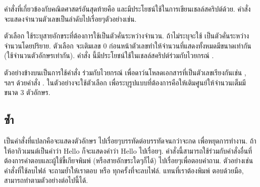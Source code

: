 \begin{thwbr}
\medskip
คำสั่งที่เกี่ยวข้องกับคณิตศาสตร์อันสุดท้ายคือ  และมีประโยชน์ใช้ในการเขียนเชลล์สคริปต์ด้วย. คำสั่ง  จะแสดงจำนวนตัวเลขเป็นลำดับไปเรื่อยๆตัวอย่างเช่น.
\begin{MyExample}
\end{MyExample}%
ตัวเลือก  ใช้ระบุสายอักขระที่ต้องการใช้เป็นตัวคั่นระหว่างจำนวน. ถ้าไม่ระบุจะใช้  เป็นตัวคั่นระหว่างจำนวนโดยปริยาย. ตัวเลือก  จะเติมเลข 0 ก่อนหน้าตัวเลขทำให้จำนวนที่แสดงทั้งหมดมีขนาดเท่ากัน (ใช้จำนวนตัวอักษรเท่ากัน). คำสั่ง  นี้มีประโยชน์ใช้ในเชลล์สคริปต์ร่วมกับไวยกรณ์ .
\begin{MyExample}
\end{MyExample}
ตัวอย่างข้างบนเป็นการใช้คำสั่ง  ร่วมกับไวยกรณ์  เพื่อดาว์นโหลดเอกสารที่เป็นตัวเลขเรียงกันเช่น ,  ฯลฯ ด้วยคำสั่ง . ในตัวอย่างจะใช้ตัวเลือก  เพื่อระบุรูปแบบที่ต้องการคือให้เติมศูนย์ให้จำนวนเต็มมีขนาด 3 ตัวอักษร.

\subsection{ซ้ำ}
 เป็นคำสั่งที่แปลกคือจะแสดงตัวอักษร  ไปเรื่อยๆบรรทัดต่อบรรทัดจนกว่าจะกด  เพื่อหยุดการทำงาน. ถ้าให้อากิวเมนต์เป็นคำว่า Hello ก็จะแสดงคำว่า Hello ไปเรื่อยๆ. คำสั่งนี้สามารถใช้ร่วมกับคำสั่งอื่นที่ต้องการคำตอบและผู้ใช้ขี้เกียจพิมพ์  (หรือสายอักขระใดๆก็ได้) ไปเรื่อยๆเพื่อตอบคำถาม. ตัวอย่างเช่นคำสั่งที่ใช้ลบไฟล์  จะถามย้ำให้เราตอบ  หรือ  ทุกครั้งที่จะลบไฟล์. แทนที่เราต้องพิมพ์  ตอบด้วยมือ, สามารถทำตามตัวอย่างต่อไปนี้ได้. 
\begin{MyExample}
\end{MyExample}%



\end{thwbr}
